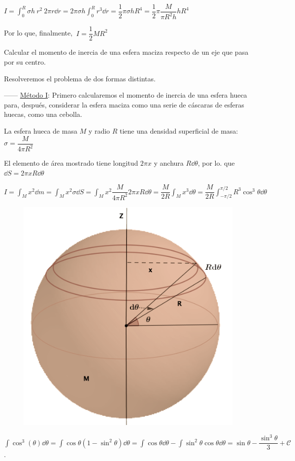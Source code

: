 $I=\displaystyle \int_0^R \sigma h \ r^2 \ 2\pi r \dd r=2\pi \sigma h \int_0^R r^3 \dd r=\dfrac 1 2 \pi \sigma h R^4 = \dfrac 1 2 \pi \dfrac {M}{\pi R^2 h} h R^4 $

Por lo que, finalmente, $\ I=\dfrac 1 2 M R^2$

\begin{prob}
Calcular el momento de inercia de una esfera maciza respecto de un eje que pasa por su centro.	
\end{prob}

Resolveremos el problema de dos formas distintas.

------ \underline{Método I}:  Primero calcularemos el momento de inercia de una esfera hueca para, después, considerar la esfera maciza como una serie de cáscaras de esferas huecas, como una cebolla.

\vspace{35mm} %
\begin{multicols}{2}
La esfera hueca de masa $M$ y radio $R$ tiene una densidad superficial de masa: $\sigma=\dfrac{M}{4\pi R^2}$

El elemento de área mostrado tiene longitud $2\pi x$ y anchura $R\dd \theta$, por lo. que $\dd S= 2\pi x R \dd \theta$

$I=\displaystyle \int_M x^2 \dd m=\int_M x^2 \sigma \dd S=\int_M x^2 \dfrac {M}{4\pi R^2} 2 \pi x R \dd \theta =\dfrac{M}{2R}\int_M x^3 \dd \theta= \dfrac {M}{2R}\int_{-\pi/2}^{\pi/2}R^3 \cos^3 \theta \dd \theta$
\begin{figure}[H]
	\centering
	\includegraphics[width=.35\textwidth]{imagenes/imagenes16/T16IM16.png}
\end{figure}
\end{multicols}

\textcolor{gris}{\footnotesize{$\displaystyle \int \cos^3(\theta)\dd \theta = \int \cos \theta (1-\sin^2 \theta) \dd \theta = \int  \cos \theta \dd \theta - \int \sin^2 \theta \cos \theta \dd \theta = \sin \theta - \dfrac {\sin^3 \theta}{3} + \mathcal C$}}\normalsize{.}

